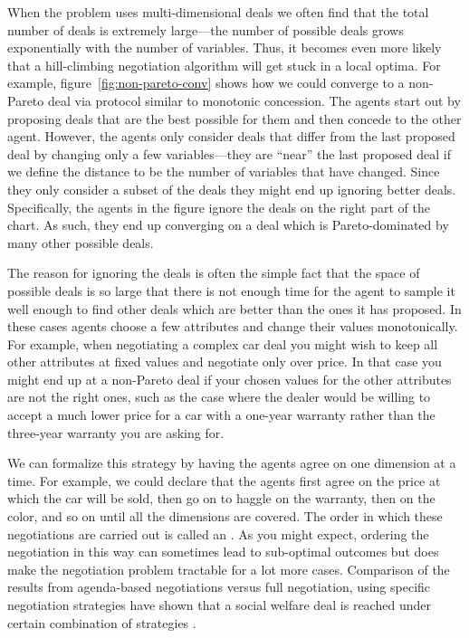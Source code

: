 When the problem uses multi-dimensional deals we often find that the
total number of deals is extremely large---the number of possible
deals grows exponentially with the number of variables. Thus, it
becomes even more likely that a hill-climbing negotiation algorithm
will get stuck in a local optima. For example,
figure~\ref{fig:non-pareto-conv} shows how we could converge to a
non-Pareto deal via protocol similar to monotonic concession. The
agents start out by proposing deals that are the best possible for
them and then concede to the other agent. However, the agents only
consider deals that differ from the last proposed deal by changing
only a few variables---they are ``near'' the last proposed deal if we
define the distance to be the number of variables that have
changed. Since they only consider a subset of the deals they might
end up ignoring better deals.  Specifically, the agents in the figure
ignore the deals on the right part of the chart.  As such, they end up
converging on a deal which is Pareto-dominated by many other possible
deals.

The reason for ignoring the deals is often the simple fact that the
space of possible deals is so large that there is not enough time for
the agent to sample it well enough to find other deals which are
better than the ones it has proposed. In these cases agents choose a
few attributes and change their values monotonically. For example,
when negotiating a complex car deal you might wish to keep all other
attributes at fixed values and negotiate only over price. In that case
you might end up at a non-Pareto deal if your chosen values for the
other attributes are not the right ones, such as the case where the
dealer would be willing to accept a much lower price for a car with a
one-year warranty rather than the three-year warranty you are asking
for.

We can formalize this strategy by having the agents agree on one
dimension at a time. For example, we could declare that the agents
first agree on the price at which the car will be sold, then go on to
haggle on the warranty, then on the color, and so on until all the
dimensions are covered. The order in which these negotiations are
carried out is called an . As you might expect, ordering
the negotiation in this way can sometimes lead to sub-optimal outcomes
but does make the negotiation problem tractable for a lot more cases.
Comparison of the results from agenda-based negotiations versus full
negotiation, using specific negotiation strategies have shown that a
social welfare deal is reached under certain combination of
strategies \cite{fatima04b} . 

